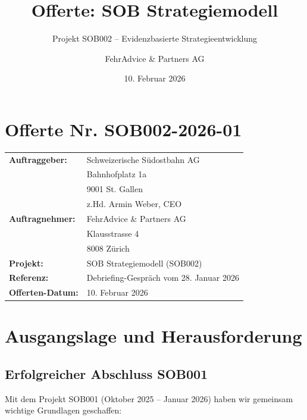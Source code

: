 \documentclass{fehradvice-report}
\title{Offerte: SOB Strategiemodell}
\subtitle{Projekt SOB002 -- Evidenzbasierte Strategieentwicklung}
\author{FehrAdvice \& Partners AG}
\date{10. Februar 2026}
\begin{document}
\maketitle

\vspace{1cm}

\section*{Offerte Nr. SOB002-2026-01}

\begin{center}
\begin{tabular}{p{4cm}p{9cm}}
\textbf{Auftraggeber:} & Schweizerische Südostbahn AG \\
                       & Bahnhofplatz 1a \\
                       & 9001 St. Gallen \\
                       & z.Hd. Armin Weber, CEO \\[0.3cm]
\textbf{Auftragnehmer:} & FehrAdvice \& Partners AG \\
                        & Klausstrasse 4 \\
                        & 8008 Zürich \\[0.3cm]
\textbf{Projekt:} & SOB Strategiemodell (SOB002) \\
\textbf{Referenz:} & Debriefing-Gespräch vom 28. Januar 2026 \\[0.3cm]
\textbf{Offerten-Datum:} & 10. Februar 2026 \\
\end{tabular}
\end{center}

\newpage
\section{Ausgangslage und Herausforderung}

\subsection{Erfolgreicher Abschluss SOB001}

Mit dem Projekt SOB001 (Oktober 2025 -- Januar 2026) haben wir gemeinsam wichtige Grundlagen geschaffen:
\end{document}
